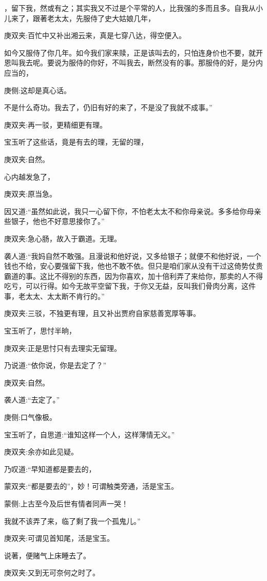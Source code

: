 \begin{parag}
，留下我，然或有之；其实我又不过是个平常的人，比我强的多而且多。自我从小儿来了，跟著老太太，先服侍了史大姑娘几年，\begin{note}庚双夹:百忙中又补出湘云来，真是七穿八达，得空便入。\end{note}如今又服侍了你几年。如今我们家来赎，正是该叫去的，只怕连身价也不要，就开恩叫我去呢。要说为服侍的你好，不叫我去，断然没有的事。那服侍的好，是分内应当的，\begin{note}庚侧:这却是真心话。\end{note}不是什么奇功。我去了，仍旧有好的来了，不是没了我就不成事。”\begin{note}庚双夹:再一驳，更精细更有理。\end{note}宝玉听了这些话，竟是有去的理，无留的理，\begin{note}庚双夹:自然。\end{note}心内越发急了，\begin{note}庚双夹:原当急。\end{note}因又道:“虽然如此说，我只一心留下你，不怕老太太不和你母亲说。多多给你母亲些银子，他也不好意思接你了。”\begin{note}庚双夹:急心肠，故入于霸道。无理。\end{note}袭人道:“我妈自然不敢强。且漫说和他好说，又多给银子；就便不和他好说，一个钱也不给，安心要强留下我，他也不敢不依。但只是咱们家从没有干过这倚势仗贵霸道的事。这比不得别的东西，因为你喜欢，加十倍利弄了来给你，那卖的人不得吃亏，可以行得。如今无故平空留下我，于你又无益，反叫我们骨肉分离，这件事，老太太、太太断不肯行的。”\begin{note}庚双夹:三驳，不独更有理，且又补出贾府自家慈善宽厚等事。\end{note}宝玉听了，思忖半晌，\begin{note}庚双夹:正是思忖只有去理实无留理。\end{note}乃说道:“依你说，你是去定了？”\begin{note}庚双夹:自然。\end{note}袭人道:“去定了。”\begin{note}庚侧:口气像极。\end{note}宝玉听了，自思道:“谁知这样一个人，这样薄情无义。”\begin{note}庚双夹:余亦如此见疑。\end{note}乃叹道:“早知道都是要去的，\begin{note}蒙双夹:“都是要去的”，妙！可谓触类旁通，活是宝玉。\end{note}\begin{note}蒙侧:上古至今及后世有情者同声一哭！\end{note}我就不该弄了来，临了剩了我一个孤鬼儿。”\begin{note}庚双夹:可谓见首知尾，活是宝玉。\end{note}说著，便赌气上床睡去了。\begin{note}庚双夹:又到无可奈何之时了。\end{note}
\end{parag}


